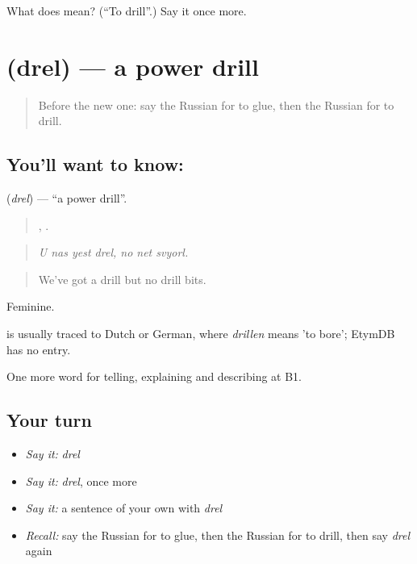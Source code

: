 \begin{tcolorbox}[breakable,colback=teal!4,colframe=teal!35!black,title={Before you move on}]
What does  mean? (\textquotedblleft{}To drill\textquotedblright{}.) Say it once more.
\end{tcolorbox}
\section[\texorpdfstring{\ru{дрель} (drel)}{дрель (drel)}]{ (drel) — a power drill}

\label{lesson:RU-C532-drel}



\begin{quote}
Before the new one: say the Russian for to glue, then the Russian for to drill.
\end{quote}

\subsection*{You'll want to know: }
\textbf{} (\emph{drel}) — \textquotedblleft{}a power drill\textquotedblright{}.

\begin{quote}
   ,   .
\end{quote}

\begin{quote}
\emph{U nas yest drel, no net svyorl.}
\end{quote}

\begin{quote}
We've got a drill but no drill bits.
\end{quote}

Feminine.

\begin{cousinweb}
\emph{} is usually traced to Dutch or German, where \emph{drillen} means 'to bore'; EtymDB has no entry.
\end{cousinweb}

\begin{grammarlens}[title={What you've built}]
One more word for telling, explaining and describing at B1.
\end{grammarlens}

\subsection*{Your turn}
\begin{itemize}
\raggedright
  \item \emph{Say it:} \emph{drel}
  \item \emph{Say it:} \emph{drel}, once more
  \item \emph{Say it:} a sentence of your own with \emph{drel}
  \item \emph{Recall:} say the Russian for to glue, then the Russian for to drill, then say \emph{drel} again
\end{itemize}


